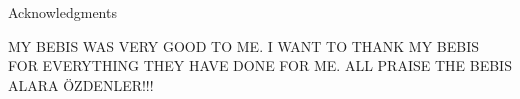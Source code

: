 \thispagestyle{empty}

\vspace*{20mm}

\begin{center}
    { Acknowledgments}
\end{center}

\vspace{10mm}


MY BEBIS WAS VERY GOOD TO ME. I WANT TO THANK MY BEBIS FOR EVERYTHING THEY HAVE DONE FOR ME. ALL PRAISE THE BEBIS ALARA ÖZDENLER!!!

\cleardoublepage{}
